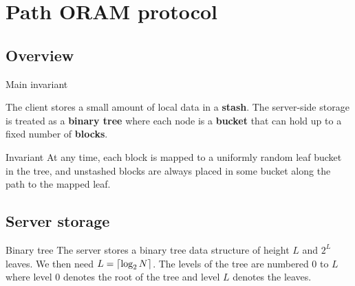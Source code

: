 
\section{Path ORAM protocol}

	\subsection{Overview}

		\begin{frame}{Main invariant}
			
			The client stores a small amount of local data in a \textbf{stash}.
			The server-side storage is treated as a \textbf{binary tree} where each node is a \textbf{bucket} that can hold up to a fixed number of \textbf{blocks}.

			\begin{block}{Invariant}
				At any time, each block is mapped to a uniformly random leaf bucket in the tree, and unstashed blocks are always placed in some bucket along the path to the mapped leaf.
			\end{block}

		\end{frame}

	\subsection{Server storage}

		\begin{frame}{\subsecname}
			
			\begin{block}{Binary tree}
				The server stores a binary tree data structure of height $L$ and $2^L$ leaves.
				We then need $L = \ceil*{ \log_2 N }$. 
				The levels of the tree are numbered $0$ to $L$ where level $0$ denotes the root of the tree and level $L$ denotes the leaves.
			\end{block}

		\end{frame}

